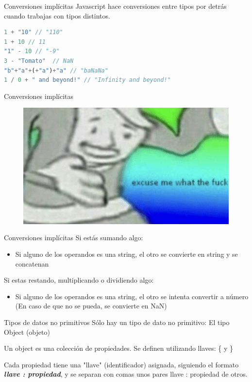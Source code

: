 \documentclass{beamer}
\begin{document}
\begin{frame}[fragile]{Conversiones implícitas}
Javascript hace conversiones entre tipos por detrás cuando trabajas con tipos distintos.

\begin{lstlisting}[language=JavaScript]
1 + "10" // "110"
1 + 10 // 11
"1" - 10 // "-9"
3 - "Tomato"  // NaN
"b"+"a"+(+"a")+"a" // "baNaNa"
1 / 0 + " and beyond!" // "Infinity and beyond!"
\end{lstlisting}
\end{frame}

\begin{frame}{Conversiones implícitas}
    \begin{figure}
        \centering
        \includegraphics[width=\textwidth]{images/excuse_me.jpg}
    \end{figure}
\end{frame}

\begin{frame}{Conversiones implícitas}
Si estás sumando algo:
\begin{itemize}
    \item Si alguno de los operandos es una string, el otro se convierte en string y se concatenan
\end{itemize}

Si estas restando, multiplicando o dividiendo algo:
\begin{itemize}
    \item Si alguno de los operandos es una string, el otro se intenta convertir a número (En caso de que no se pueda, se convierte en NaN)
\end{itemize}
\end{frame}

\begin{frame}{Tipos de datos no primitivos}
Sólo hay un tipo de dato no primitivo: El tipo Object (objeto)

Un object es una colección de propiedades. Se definen utilizando llaves: \{ y \}

Cada propiedad tiene una "llave" (identificador) asignada, siguiendo el formato \textbf{\textit{llave : propiedad}}, y se separan con comas unos pares llave : propiedad de otros.
\end{frame}
\end{document}
